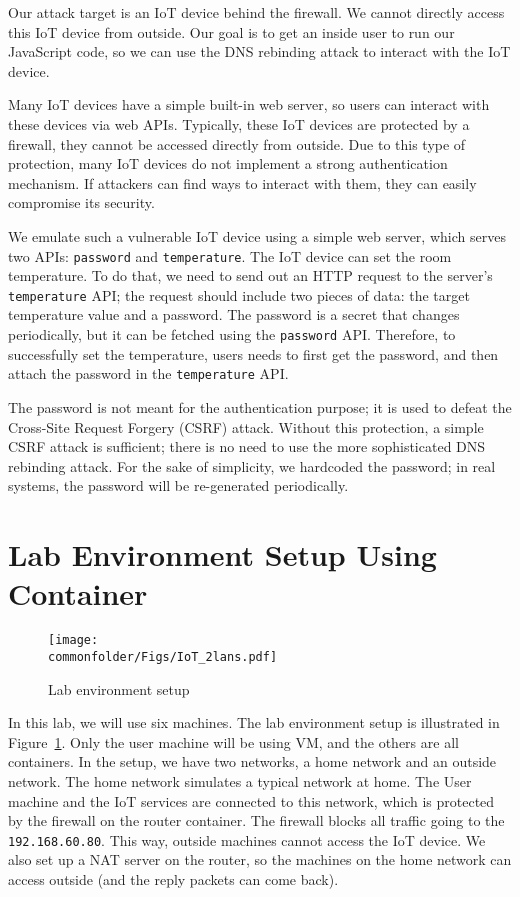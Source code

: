 Our attack target is an IoT device behind the firewall. We cannot directly
access this IoT device from outside. Our goal is to get an inside
user to run our JavaScript code, so we can use
the DNS rebinding attack to interact with the IoT device.


Many IoT devices have a simple built-in web server, so users can
interact with these devices via web APIs. Typically, these IoT
devices are protected by a firewall, they cannot be accessed directly
from outside. Due to this type of protection,  many IoT devices do not
implement a strong authentication mechanism. If attackers can find ways
to interact with them, they can easily compromise its security.

We emulate such a vulnerable IoT device using 
a simple web server, which serves
two APIs: \texttt{password} and \texttt{temperature}.
The IoT device can set the room temperature. To do that,
we need to send out an HTTP request to the server's
\texttt{temperature} API; the request should include
two pieces of data: the target temperature value and a
password.  The password is a secret that changes
periodically, but it can be fetched using
the \texttt{password} API. Therefore, to successfully
set the temperature, users needs to
first get the password, and then attach the password
in the \texttt{temperature} API.

The password is not meant for the authentication purpose; it is used to defeat the Cross-Site
Request Forgery (CSRF) attack. Without this protection, a simple CSRF attack is sufficient;
there is no need to use the more sophisticated DNS rebinding attack.
For the sake of simplicity, we hardcoded the
password; in real systems, the password will be re-generated periodically.




\section{Lab Environment Setup Using Container}



\begin{figure}[htb]
\centering
\texttt{[image: \\commonfolder/Figs/IoT\_2lans.pdf]}
\caption{Lab environment setup}
\label{rebind:fig:labsetup}
\end{figure}


In this lab, we will use six machines. 
The lab environment setup is illustrated
in Figure~\ref{rebind:fig:labsetup}. Only the user machine 
will be using VM, and the others are all containers. 
In the setup, we have two networks, a home network and 
an outside network. The home network 
simulates a typical network at home. 
The User machine and the IoT 
services are connected to this network, which
is protected by the firewall on the router container. 
The firewall blocks
all traffic going to the \texttt{192.168.60.80}. 
This way, outside machines cannot 
access the IoT device.
We also set up a NAT server on the router, so the machines
on the home network can access outside (and the reply
packets can come back). 

